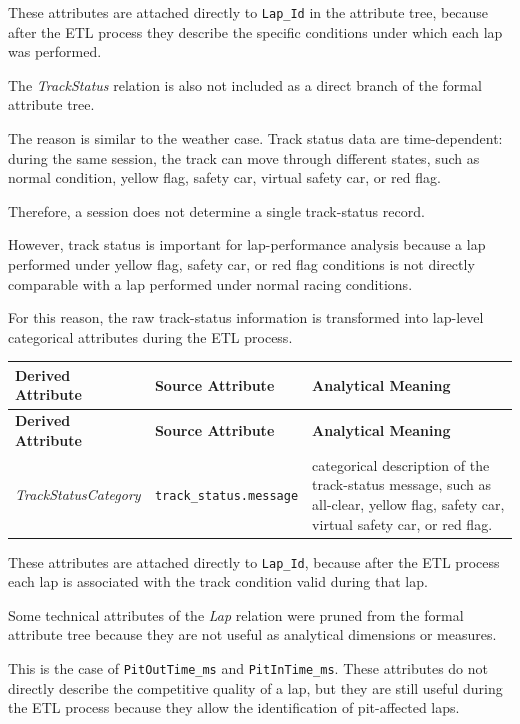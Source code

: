\documentclass[a4paper,11pt]{article}
\begin{document}
	These attributes are attached directly to \texttt{Lap\_Id} in the attribute tree, because after
	the ETL process they describe the specific conditions under which each lap was performed.
	
	
	The \textit{TrackStatus} relation is also not included as a direct branch of the formal
	attribute tree.
	
	The reason is similar to the weather case. Track status data are time-dependent: during
	the same session, the track can move through different states, such as normal condition,
	yellow flag, safety car, virtual safety car, or red flag.
	
	Therefore, a session does not determine a single track-status record.
	
	However, track status is important for lap-performance analysis because a lap performed
	under yellow flag, safety car, or red flag conditions is not directly comparable with a lap
	performed under normal racing conditions.
	
	For this reason, the raw track-status information is transformed into lap-level categorical
	attributes during the ETL process.
	
	\begin{longtable}{|p{4.2cm}|p{4.2cm}|p{6.2cm}|}
		\hline
		\textbf{Derived Attribute} & \textbf{Source Attribute} & \textbf{Analytical Meaning} \\
		\hline
		\endfirsthead
		
		\hline
		\textbf{Derived Attribute} & \textbf{Source Attribute} & \textbf{Analytical Meaning} \\
		\hline
		\endhead
		
		\textit{TrackStatusCategory}
		& \texttt{track\_status.message}
		& categorical description of the track-status message, such as all-clear, yellow flag, safety car, virtual safety car, or red flag. \\
		\hline
	\end{longtable}
	
	These attributes are attached directly to \texttt{Lap\_Id}, because after the ETL process
	each lap is associated with the track condition valid during that lap.
	
	
	Some technical attributes of the \textit{Lap} relation were pruned from the formal attribute
	tree because they are not useful as analytical dimensions or measures.
	
	This is the case of \texttt{PitOutTime\_ms} and \texttt{PitInTime\_ms}. These attributes do
	not directly describe the competitive quality of a lap, but they are still useful during the
	ETL process because they allow the identification of pit-affected laps.
	
\end{document}
